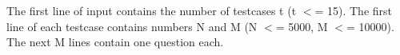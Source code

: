 The first line of input contains the number of testcases t (t $<$= 15). The first line of each testcase contains numbers N and M (N $<$= 5000, M $<$= 10000). The next M lines contain one question each.